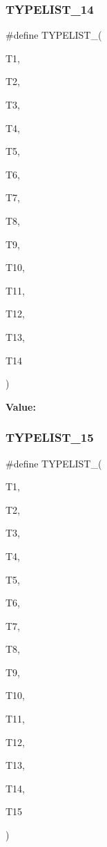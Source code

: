 \subsubsection{\texorpdfstring{TYPELIST\_14}{TYPELIST\_14}}
{\footnotesize\ttfamily \#define T\+Y\+P\+E\+L\+I\+S\+T\+\_(\begin{DoxyParamCaption}\item[{}]{T1,  }\item[{}]{T2,  }\item[{}]{T3,  }\item[{}]{T4,  }\item[{}]{T5,  }\item[{}]{T6,  }\item[{}]{T7,  }\item[{}]{T8,  }\item[{}]{T9,  }\item[{}]{T10,  }\item[{}]{T11,  }\item[{}]{T12,  }\item[{}]{T13,  }\item[{}]{T14 }\end{DoxyParamCaption})}

{\bfseries Value\+:}
\begin{DoxyCode}{0}

\end{DoxyCode}
\mbox{\label{adat-devel_2lib_2adat_2typelist_8h_a45a2c78a073e118590d766743e9e1cb4}} 
\subsubsection{\texorpdfstring{TYPELIST\_15}{TYPELIST\_15}}
{\footnotesize\ttfamily \#define T\+Y\+P\+E\+L\+I\+S\+T\+\_(\begin{DoxyParamCaption}\item[{}]{T1,  }\item[{}]{T2,  }\item[{}]{T3,  }\item[{}]{T4,  }\item[{}]{T5,  }\item[{}]{T6,  }\item[{}]{T7,  }\item[{}]{T8,  }\item[{}]{T9,  }\item[{}]{T10,  }\item[{}]{T11,  }\item[{}]{T12,  }\item[{}]{T13,  }\item[{}]{T14,  }\item[{}]{T15 }\end{DoxyParamCaption})}

